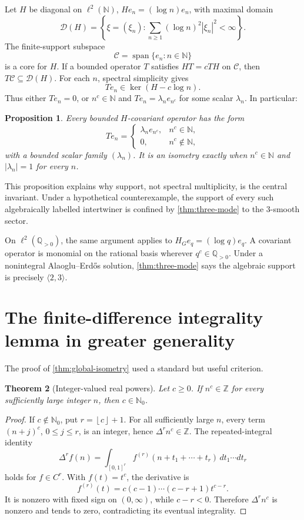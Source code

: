 \documentclass[11pt,oneside]{article}
\newtheorem{theorem}{Theorem}[section]
\newtheorem{proposition}[theorem]{Proposition}
\theoremstyle{definition}
\theoremstyle{remark}
\newcommand{\N}{\mathbb N}
\newcommand{\Nzero}{\mathbb N_0}
\newcommand{\Z}{\mathbb Z}
\newcommand{\Qp}{\mathbb Q_{>0}}
\newcommand{\spn}{\operatorname{span}}
\newcommand{\floor}[1]{\left\lfloor #1\right\rfloor}
\begin{document}
Let \(H\) be diagonal on \(\ell^2(\N)\),
\(He_n=(\log n)e_n\), with maximal domain
\[
 \mathcal D(H)
 =\left\{\xi=(\xi_n):
   \sum_{n\geq1}(\log n)^2|\xi_n|^2<\infty\right\}.
\]
The finite-support subspace
\[
        \mathcal C=\spn\{e_n:n\in\N\}
\]
is a core for \(H\).  If a bounded operator \(T\) satisfies
\(HT=cTH\) on \(\mathcal C\), then \(T\mathcal C\subseteq\mathcal D(H)\).
For each \(n\), spectral simplicity gives
\[
        Te_n\in\ker(H-c\log n).
\]
Thus either \(Te_n=0\), or \(n^c\in\N\) and
\(Te_n=\lambda_ne_{n^c}\) for some scalar \(\lambda_n\).  In
particular:

\begin{proposition}\label{prop:all-H-intertwiners}
Every bounded \(H\)-covariant operator has the form
\[
        Te_n=
        \begin{cases}
        \lambda_ne_{n^c},&n^c\in\N,\\
        0,&n^c\notin\N,
        \end{cases}
\]
with a bounded scalar family \((\lambda_n)\).  It is an isometry exactly
when \(n^c\in\N\) and \(|\lambda_n|=1\) for every \(n\).
\end{proposition}

This proposition explains why support, not spectral multiplicity, is the
central invariant.  Under a hypothetical counterexample, the support of
every such algebraically labelled intertwiner is confined by
\cref{thm:three-mode} to the \(3\)-smooth sector.

On \(\ell^2(\Qp)\), the same argument applies to
\(H_Ge_q=(\log q)e_q\).  A covariant operator is monomial on the rational
basis wherever \(q^c\in\Qp\).  Under a nonintegral
Alaoglu--Erd\H{o}s solution, \cref{thm:three-mode} says the algebraic
support is precisely \(\langle2,3\rangle\).

\section{The finite-difference integrality lemma in greater generality}

The proof of \cref{thm:global-isometry} used a standard but useful
criterion.

\begin{theorem}[Integer-valued real powers]\label{thm:integer-valued-powers}
Let \(c\geq0\).  If \(n^c\in\Z\) for every sufficiently large integer
\(n\), then \(c\in\Nzero\).
\end{theorem}

\begin{proof}
If \(c\notin\Nzero\), put \(r=\floor c+1\).  For all sufficiently large
\(n\), every term \((n+j)^c\), \(0\leq j\leq r\), is an integer, hence
\(\Delta^r n^c\in\Z\).  The repeated-integral identity
\[
 \Delta^r f(n)
 =\int_{[0,1]^r}f^{(r)}(n+t_1+\cdots+t_r)
   \,dt_1\cdots dt_r
\]
holds for \(f\in C^r\).  With \(f(t)=t^c\), the derivative is
\[
        f^{(r)}(t)
        =c(c-1)\cdots(c-r+1)t^{c-r}.
\]
It is nonzero with fixed sign on \((0,\infty)\), while \(c-r<0\).
Therefore \(\Delta^r n^c\) is nonzero and tends to zero, contradicting
its eventual integrality.
\end{proof}
\end{document}
